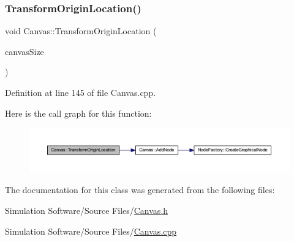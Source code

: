 \subsubsection{\texorpdfstring{Transform\+Origin\+Location()}{TransformOriginLocation()}}
{\footnotesize\ttfamily void Canvas\+::\+Transform\+Origin\+Location (\begin{DoxyParamCaption}\item[{wx\+Size}]{canvas\+Size }\end{DoxyParamCaption})}



Definition at line 145 of file Canvas.\+cpp.

Here is the call graph for this function\+:
\nopagebreak
\begin{figure}[H]
\begin{center}
\leavevmode
\includegraphics[width=350pt]{class_canvas_a4afa0e24da7b82be3696131c13d89404_cgraph}
\end{center}
\end{figure}


The documentation for this class was generated from the following files\+:\begin{DoxyCompactItemize}
\item 
Simulation Software/\+Source Files/\hyperlink{_canvas_8h}{Canvas.\+h}\item 
Simulation Software/\+Source Files/\hyperlink{_canvas_8cpp}{Canvas.\+cpp}\end{DoxyCompactItemize}

